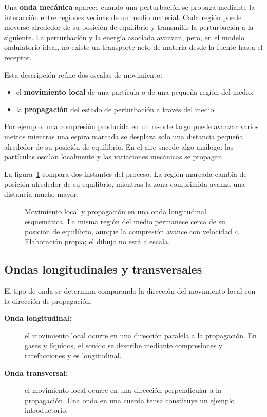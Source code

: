 Una \textbf{onda mecánica} aparece cuando una perturbación se propaga mediante
la interacción entre regiones vecinas de un medio material. Cada región puede
moverse alrededor de su posición de equilibrio y transmitir la perturbación a
la siguiente. La perturbación y la energía asociada avanzan, pero, en el
modelo ondulatorio ideal, no existe un transporte neto de materia desde la
fuente hasta el receptor.

Esta descripción reúne dos escalas de movimiento:

\begin{itemize}
    \item el \textbf{movimiento local} de una partícula o de una pequeña
    región del medio;
    \item la \textbf{propagación} del estado de perturbación a través del
    medio.
\end{itemize}

Por ejemplo, una compresión producida en un resorte largo puede avanzar varios
metros mientras una espira marcada se desplaza solo una distancia pequeña
alrededor de su posición de equilibrio. En el aire sucede algo análogo: las
partículas oscilan localmente y las variaciones mecánicas se propagan.

La figura~\ref{fig:u3-oscilacion-propagacion} compara dos instantes del
proceso. La región marcada cambia de posición alrededor de su equilibrio,
mientras la zona comprimida avanza una distancia mucho mayor.

\begin{figure}[htbp]
    \centering
    
    \caption{Movimiento local y propagación en una onda longitudinal
    esquemática. La misma región del medio permanece cerca de su posición de
    equilibrio, aunque la compresión avance con velocidad \(c\). Elaboración
    propia; el dibujo no está a escala.}
    \label{fig:u3-oscilacion-propagacion}
\end{figure}

\subsection{Ondas longitudinales y transversales}
\label{sec:u3-longitudinal-transversal}

El tipo de onda se determina comparando la dirección del movimiento local con
la dirección de propagación:

\begin{description}
    \item[\textbf{Onda longitudinal:}] el movimiento local ocurre en una
    dirección paralela a la propagación. En gases y líquidos, el sonido se
    describe mediante compresiones y rarefacciones y es longitudinal.
    \item[\textbf{Onda transversal:}] el movimiento local ocurre en una
    dirección perpendicular a la propagación. Una onda en una cuerda tensa
    constituye un ejemplo introductorio.
\end{description}

